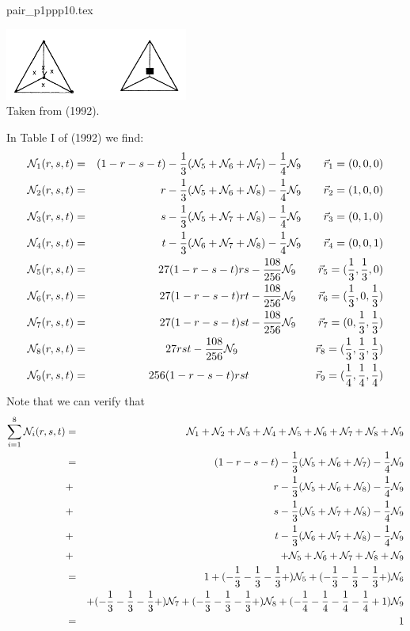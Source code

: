 \begin{flushright} {\tiny {\color{gray} pair\_p1ppp10.tex}} \end{flushright}


\begin{center}
\includegraphics[width=6cm]{images/pair_p1ppp1/p1ppp1}\\
{\captionfont Taken from \textcite{begt92} (1992).}
\end{center}

In Table I of \textcite{begt92} (1992) we find:
\begin{eqnarray}
{\mathcal{N}}_1(r,s,t) &=& (1-r-s-t)-\frac13 ({\mathcal{N}}_5+{\mathcal{N}}_6+{\mathcal{N}}_7)-\frac14 {\mathcal{N}}_9 \qquad \vec{r}_1=(0,0,0) \nonumber\\
{\mathcal{N}}_2(r,s,t) &=& r-\frac13 ({\mathcal{N}}_5+{\mathcal{N}}_6+{\mathcal{N}}_8)-\frac14 {\mathcal{N}}_9 \qquad \vec{r}_2=(1,0,0) \nonumber\\
{\mathcal{N}}_3(r,s,t) &=& s-\frac13 ({\mathcal{N}}_5+{\mathcal{N}}_7+{\mathcal{N}}_8)-\frac14 {\mathcal{N}}_9 \qquad \vec{r}_3=(0,1,0) \nonumber\\
{\mathcal{N}}_4(r,s,t) &=& t-\frac13 ({\mathcal{N}}_6+{\mathcal{N}}_7+{\mathcal{N}}_8)-\frac14 {\mathcal{N}}_9 \qquad \vec{r}_4=(0,0,1) \nonumber\\
{\mathcal{N}}_5(r,s,t) &=& 27(1-r-s-t)rs-\frac{108}{256}{\mathcal{N}}_9          \qquad \vec{r}_5=(\frac13,\frac13,0) \nonumber\\
{\mathcal{N}}_6(r,s,t) &=& 27(1-r-s-t)rt-\frac{108}{256}{\mathcal{N}}_9          \qquad \vec{r}_6=(\frac13,0,\frac13) \nonumber\\
{\mathcal{N}}_7(r,s,t) &=& 27(1-r-s-t)st-\frac{108}{256}{\mathcal{N}}_9          \qquad \vec{r}_7=(0,\frac13,\frac13) \nonumber\\
{\mathcal{N}}_8(r,s,t) &=& 27rst-\frac{108}{256}{\mathcal{N}}_9  \qquad\qquad\qquad\quad \vec{r}_8=(\frac13,\frac13,\frac13)\nonumber\\ 
{\mathcal{N}}_9(r,s,t) &=& 256(1-r-s-t)rst \qquad\qquad\qquad \vec{r}_9=(\frac14,\frac14,\frac14)\nonumber
\end{eqnarray}
Note that we can verify that
\begin{eqnarray}
\sum_{i=1}^8 {\mathcal{N}}_i(r,s,t) 
&=& {\mathcal{N}}_1 +{\mathcal{N}}_2 +{\mathcal{N}}_3 +{\mathcal{N}}_4 +{\mathcal{N}}_5 +{\mathcal{N}}_6 +{\mathcal{N}}_7 +{\mathcal{N}}_8 +{\mathcal{N}}_9\nonumber\\
&=& (1-r-s-t)-\frac13 ({\mathcal{N}}_5+{\mathcal{N}}_6+{\mathcal{N}}_7)-\frac14 {\mathcal{N}}_9 \nonumber\\
&+& r-\frac13 ({\mathcal{N}}_5+{\mathcal{N}}_6+{\mathcal{N}}_8)-\frac14 {\mathcal{N}}_9 \nonumber\\
&+& s-\frac13 ({\mathcal{N}}_5+{\mathcal{N}}_7+{\mathcal{N}}_8)-\frac14 {\mathcal{N}}_9 \nonumber\\
&+& t-\frac13 ({\mathcal{N}}_6+{\mathcal{N}}_7+{\mathcal{N}}_8)-\frac14 {\mathcal{N}}_9 \nonumber\\
&+& +{\mathcal{N}}_5 +{\mathcal{N}}_6 +{\mathcal{N}}_7 +{\mathcal{N}}_8 +{\mathcal{N}}_9 \nonumber\\
&=& 1 
+ (-\frac13-\frac13-\frac13 + )  {\mathcal{N}}_5
+ (-\frac13-\frac13-\frac13 + )  {\mathcal{N}}_6 \nonumber\\
&& + (-\frac13-\frac13-\frac13 + )  {\mathcal{N}}_7
+ (-\frac13-\frac13-\frac13 + )  {\mathcal{N}}_8 
+ (-\frac14 -\frac14-\frac14 -\frac14 +1) {\mathcal{N}}_9 \nonumber\\
&=& 1
\end{eqnarray}



